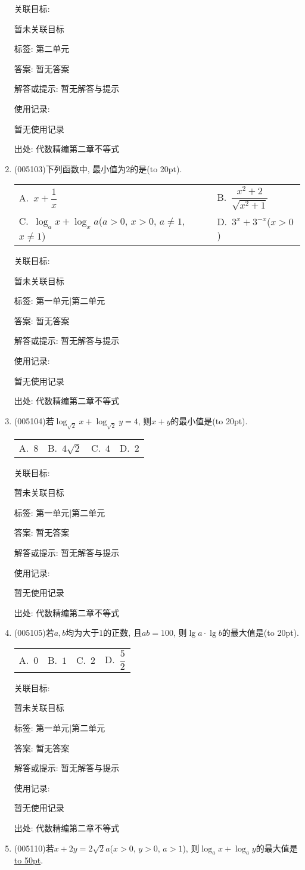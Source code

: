 \documentclass[10pt,a4paper]{article}
\newcommand{\blank}[1]{\underline{\hbox to #1pt{}}}
\newcommand{\bracket}[1]{(\hbox to #1pt{})}
\newcommand{\twoch}[4]{\par\begin{tabular}{p{.46\textwidth}p{.46\textwidth}}
A.~#1& B.~#2\\
C.~#3& D.~#4
\end{tabular}}
\newcommand{\fourch}[4]{\par\begin{tabular}{p{.23\textwidth}p{.23\textwidth}p{.23\textwidth}p{.23\textwidth}}
A.~#1 &B.~#2& C.~#3& D.~#4
\end{tabular}}
\begin{document}
\begin{enumerate}[1.]
关联目标:

暂未关联目标



标签: 第二单元

答案: 暂无答案

解答或提示: 暂无解答与提示

使用记录:

暂无使用记录


出处: 代数精编第二章不等式
\item { (005103)}下列函数中, 最小值为$2$的是\bracket{20}.
\twoch{$x+\dfrac 1x$}{$\dfrac{x^2+2}{\sqrt{x^2+1}}$}{$\log_ax+\log_xa$($a>0$, $x>0$, $a\ne 1$, $x\ne 1$)}{$3^x+3^{-x}$($x>0$)}


关联目标:

暂未关联目标



标签: 第一单元|第二单元

答案: 暂无答案

解答或提示: 暂无解答与提示

使用记录:

暂无使用记录


出处: 代数精编第二章不等式
\item { (005104)}若$\log_{\sqrt 2}x+\log_{\sqrt 2}y=4$, 则$x+y$的最小值是\bracket{20}.
\fourch{$8$}{$4\sqrt 2$}{$4$}{$2$}


关联目标:

暂未关联目标



标签: 第一单元|第二单元

答案: 暂无答案

解答或提示: 暂无解答与提示

使用记录:

暂无使用记录


出处: 代数精编第二章不等式
\item { (005105)}若$a,b$均为大于$1$的正数, 且$ab=100$, 则$\lg a\cdot \lg b$的最大值是\bracket{20}.
\fourch{$0$}{$1$}{$2$}{$\dfrac 52$}


关联目标:

暂未关联目标



标签: 第一单元|第二单元

答案: 暂无答案

解答或提示: 暂无解答与提示

使用记录:

暂无使用记录


出处: 代数精编第二章不等式
\item { (005110)}若$x+2y=2\sqrt 2a$($x>0$, $y>0$, $a>1$), 则$\log_ax+\log_ay$的最大值是\blank{50}.



\end{enumerate}
\end{document}
